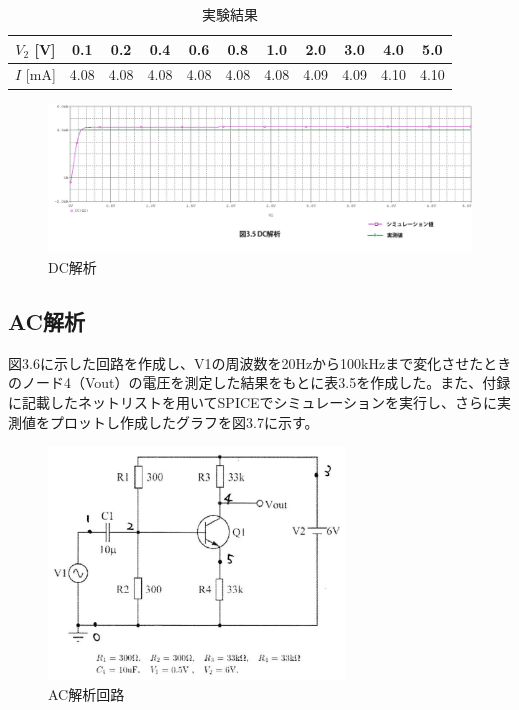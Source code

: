 \documentclass{jlreq}
\numberwithin{equation}{section}
\begin{document}
\begin{table}[H]
  \centering
    \caption{実験結果}
    \begin{tabular}{|c|c|c|c|c|c|c|c|c|c|c|}
      \hline
      \( V_{2} \) [V] & 0.1 & 0.2 & 0.4 & 0.6 & 0.8 & 1.0 & 2.0 & 3.0 & 4.0 & 5.0 \\ \hline
      \( I \) [mA] & 4.08 & 4.08 & 4.08 & 4.08 & 4.08 & 4.08 & 4.09 & 4.09 & 4.10 & 4.10 \\ \hline
    \end{tabular}
\end{table}

\begin{figure}[H]
  \centering
  \includegraphics[width=\textwidth]{assets/dckaisekiplot.png}
  \caption{DC解析}
\end{figure}

\subsection{AC解析}
図3.6に示した回路を作成し、V1の周波数を20Hzから100kHzまで変化させたときのノード4（Vout）の電圧を測定した結果をもとに表3.5を作成した。また、付録に記載したネットリストを用いてSPICEでシミュレーションを実行し、さらに実測値をプロットし作成したグラフを図3.7に示す。

\begin{figure}[H]
  \centering
  \includegraphics[width=0.7\textwidth]{assets/ackaisekikairo.png}
  \caption{AC解析回路}
\end{figure}
\end{document}
